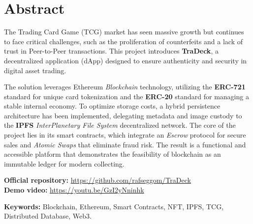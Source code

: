 \chapter*{Abstract}
The Trading Card Game (TCG) market has seen massive growth but continues to face critical challenges, such as the proliferation of counterfeits and a lack of trust in Peer-to-Peer transactions. This project introduces \textbf{TraDeck}, a decentralized application (dApp) designed to ensure authenticity and security in digital asset trading.

The solution leverages Ethereum \textit{Blockchain} technology, utilizing the \textbf{ERC-721} standard for unique card tokenization and the \textbf{ERC-20} standard for managing a stable internal economy. To optimize storage costs, a hybrid persistence architecture has been implemented, delegating metadata and image custody to the \textbf{IPFS} \textit{InterPlanetary File System} decentralized network. The core of the project lies in its smart contracts, which integrate an \textit{Escrow} protocol for secure sales and \textit{Atomic Swaps} that eliminate fraud risk. The result is a functional and accessible platform that demonstrates the feasibility of blockchain as an immutable ledger for modern collecting.

\vspace{0.4cm}

\noindent \textbf{Official repository:} \url{https://github.com/rafseggom/TraDeck} \\
\noindent \textbf{Demo video:} \url{https://youtu.be/GzI2yNninhk}

\vspace{0.6cm}

\textbf{Keywords:} Blockchain, Ethereum, Smart Contracts, NFT, IPFS, TCG, Distributed Database, Web3.
